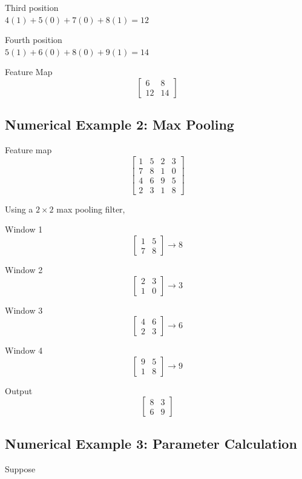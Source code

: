 \documentclass[11pt]{article}
\begin{document}
Third position\\
$4(1)+5(0)+7(0)+8(1)=12$

Fourth position\\
$5(1)+6(0)+8(0)+9(1)=14$

Feature Map
\[
\begin{bmatrix}6&8\\12&14\end{bmatrix}
\]

\vspace{4mm}
\subsection*{Numerical Example 2: Max Pooling}

Feature map
\[
\begin{bmatrix}1&5&2&3\\7&8&1&0\\4&6&9&5\\2&3&1&8\end{bmatrix}
\]

Using a $2\times2$ max pooling filter,

Window 1
\[
\begin{bmatrix}1&5\\7&8\end{bmatrix}\rightarrow8
\]

Window 2
\[
\begin{bmatrix}2&3\\1&0\end{bmatrix}\rightarrow3
\]

Window 3
\[
\begin{bmatrix}4&6\\2&3\end{bmatrix}\rightarrow6
\]

Window 4
\[
\begin{bmatrix}9&5\\1&8\end{bmatrix}\rightarrow9
\]

Output
\[
\begin{bmatrix}8&3\\6&9\end{bmatrix}
\]

\vspace{4mm}
\subsection*{Numerical Example 3: Parameter Calculation}

Suppose
\end{document}
